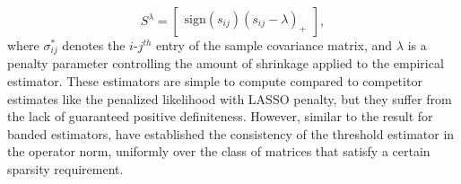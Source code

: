 \[
S^{\lambda}=   \begin{bmatrix} \mbox{sign}\left(s_{ij}\right) \left(s_{ij} - \lambda\right)_+ \end{bmatrix},
\]
\noindent 
where $\sigma^*_{ij}$ denotes the $i$-$j^{th}$ entry of the sample covariance matrix, and $\lambda$ is a penalty parameter controlling the amount of shrinkage applied to the empirical estimator. These estimators are simple to compute compared to competitor estimates like the penalized likelihood with LASSO penalty, but they suffer from the lack of guaranteed positive definiteness. However, similar to the result for banded estimators, \citet{bickel2008covariance} have established the consistency of the threshold estimator in the operator norm, uniformly over the class of matrices that satisfy a certain sparsity requirement. 